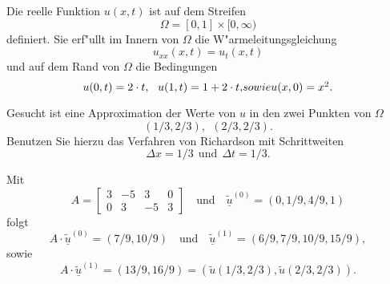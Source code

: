 Die reelle Funktion $u(x,t)$ ist auf dem Streifen
\[
\Omega = [0, 1] \times [0,\infty)
\]
definiert.
Sie erf"ullt im Innern von $\Omega$ die W"armeleitungsgleichung
\[
u_{xx}(x,t) = u_{t}(x,t)
\]
und auf dem Rand von $\Omega$ die Bedingungen
\[
u(0,t) = 2 \cdot t, \ \ u(1,t) = 1 + 2 \cdot t,$$ sowie $$u(x,0) = x^2.
\]

Gesucht ist eine Approximation der Werte von $u$ in den zwei Punkten von
$\Omega$
\[
(1/3,2/3), \ \  (2/3,2/3).
\]
Benutzen Sie hierzu das Verfahren von Richardson mit Schrittweiten
\[
\Delta x = 1/3 \ \ \mbox{und} \ \  \Delta t = 1/3.
\]

\begin{loesung}
Mit
\[
A = \left[\begin{array}{rrrr} 
3 & -5 & 3 & 0 \\
0 & 3 & -5 & 3 \end{array}\right]
\quad
\text{und}\quad
\underline{\tilde u}^{(0)} = (0, 1/9, 4/9, 1)
\]
folgt
\[
A \cdot \underline{\tilde u}^{(0)} = (7/9, 10/9)
\quad\mbox{und}\quad
\underline{\tilde u}^{(1)} = (6/9, 7/9, 10/9, 15/9),
\]
sowie
\[
A \cdot \underline{\tilde u}^{(1)} = (13/9, 16/9) = (\tilde u(1/3,2/3), \tilde u(2/3,2/3)).
\]
\end{loesung}



